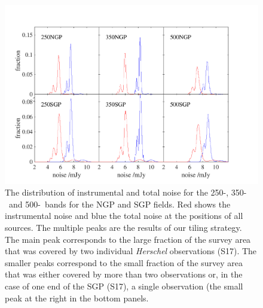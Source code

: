 \documentclass[a4paper,fleqn,usenatbib, twocolumn]{aastex61}
\begin{document}
\begin{figure} %
   \includegraphics[width=\textwidth]{noise_plots.pdf}
\caption{The distribution of instrumental and total noise for the
  250-\micron, 350-\micron\ and 500-\micron\  bands for the NGP and SGP
  fields.  Red shows the instrumental noise and blue the
  total noise at the positions of all sources.  The multiple peaks are
  the results of our tiling strategy. The main peak corresponds to the
  large fraction of the survey area that was covered by two individual
  {\it Herschel} observations (S17). The smaller peaks correspond to
  the small fraction of the survey area that was either covered by
  more than two observations or, in the case of one end of the SGP
  (S17), a single observation (the small peak at the right in the
  bottom panels.}
\label{fig_noise}
\end{figure}
\end{document}
